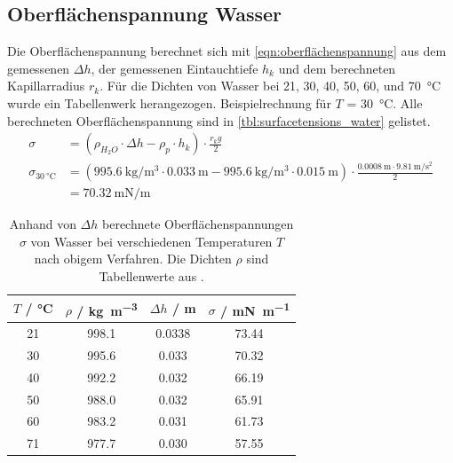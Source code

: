 \subsection{Oberflächenspannung Wasser}
Die Oberflächenspannung berechnet sich mit \autoref{eqn:oberflächenspannung} aus dem gemessenen $\Delta h$, der gemessenen Eintauchtiefe $h_k$ und dem berechneten Kapillarradius $r_k$.
Für die Dichten von Wasser bei 21, 30, 40, 50, 60, und \qty{70}{\degreeCelsius} wurde ein Tabellenwerk\autocite{crc:std-density:water} herangezogen.
Beispielrechnung für $T$ = \qty{30}{\degreeCelsius}.
Alle berechneten Oberflächenspannung sind in \autoref{tbl:surfacetensions_water} gelistet.
\begin{align*}
    \sigma &= ( \rho_{H_{2}O} \cdot \Delta h - \rho_p \cdot h_k) \cdot \frac{r_k g}{2} \\
    \sigma_{\qty{30}{\degreeCelsius}} &= ( \qty{995.6}{\kilo\gram\per\cubic\meter} \cdot \qty{0.033}{\meter} - \qty{995.6}{\kilo\gram\per\cubic\meter} \cdot \qty{0.015}{\meter} )
                                         \cdot \frac{\qty{0.0008}{\meter} \cdot \qty{9.81}{\meter\per\second\squared}}{2} \\
                                      &= \qty{70.32}{\milli\newton\per\meter}
\end{align*}

\begin{table}[H]
    \centering
    \caption{
        Anhand von $\Delta h$ berechnete Oberflächenspannungen $\sigma$ von Wasser bei verschiedenen Temperaturen $T$ nach obigem Verfahren.
        Die Dichten $\rho$ sind Tabellenwerte aus \cite{crc:std-density:water}.
        }
    \begin{tabular}{c c c c}
    \toprule
    $T$ / \unit{\degreeCelsius} & $\rho$ / \unit{\kilo\gram\per\cubic\meter} & $\Delta h$ / \unit{\meter} & $\sigma$ / \unit{\milli\newton\per\meter} \\ \midrule
    21 & 998.1 & 0.0338 & 73.44 \\ \midrule
    30 & 995.6 & 0.033  & 70.32 \\ \midrule
    40 & 992.2 & 0.032  & 66.19 \\ \midrule
    50 & 988.0 & 0.032  & 65.91 \\ \midrule
    60 & 983.2 & 0.031  & 61.73 \\ \midrule
    71 & 977.7 & 0.030  & 57.55 \\
    \bottomrule
    \end{tabular}
    \label{tbl:surfacetensions_water}
\end{table}

